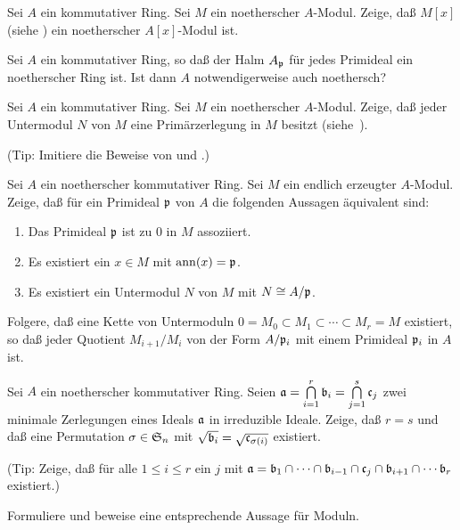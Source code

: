 \begin{exercise}
	Sei \(A\) ein kommutativer Ring.
	Sei \(M\) ein noetherscher \(A\)-Modul. Zeige, daß \(M[x]\) (siehe
	) ein noetherscher \(A[x]\)-Modul ist.
\end{exercise}

\begin{exercise}
	Sei \(A\) ein kommutativer Ring, so daß der Halm \(A_{\mathfrak{p}}\)
	für jedes Primideal ein noetherscher Ring ist. Ist dann \(A\)
	notwendigerweise auch noethersch?
\end{exercise}

\begin{exercise}
	Sei \(A\) ein kommutativer Ring. Sei \(M\) ein noetherscher \(A\)-Modul.
	Zeige, daß jeder Untermodul \(N\) von \(M\) eine Primärzerlegung in
	\(M\) besitzt (siehe~).
	
	(Tip: Imitiere die Beweise von  und
	.)
\end{exercise}

\begin{exercise}
	\label{exer:primes_to_mod}
	Sei \(A\) ein noetherscher kommutativer Ring. Sei \(M\) ein endlich
	erzeugter \(A\)-Modul. Zeige, daß für ein Primideal \(\mathfrak{p}\) von \(A\)
	die folgenden Aussagen äquivalent sind:
	\begin{enumerate}
	\item
		Das Primideal \(\mathfrak{p}\) ist zu \(0\) in \(M\) assoziiert.
	\item
		Es existiert ein \(x \in M\) mit \(\operatorname{ann}(x) = \mathfrak{p}\).
	\item
		Es existiert ein Untermodul \(N\) von \(M\) mit \(N \cong A/\mathfrak{p}\).
	\end{enumerate}
	
	Folgere, daß eine Kette von Untermoduln \(0 = M_0 \subset M_1 \subset \dotsb \subset
	M_r = M\) existiert, so daß jeder Quotient \(M_{i + 1}/M_i\) von der
	Form \(A/\mathfrak{p}_i\) mit einem Primideal \(\mathfrak{p}_i\) in \(A\) ist.
\end{exercise}

\begin{exercise}
	Sei \(A\) ein noetherscher kommutativer Ring. Seien
	\(\mathfrak{a} = \bigcap\limits_{i = 1}^r \mathfrak{b}_i
	= \bigcap\limits_{j = 1}^s \mathfrak{c}_j\) zwei minimale Zerlegungen
	eines Ideals \(\mathfrak{a}\) in irreduzible Ideale. Zeige, daß
	\(r = s\) und daß eine Permutation \(\sigma \in \mathfrak S_n\) mit
	\(\sqrt{\mathfrak{b}_i} = \sqrt{\mathfrak{c}_{\sigma(i)}}\) existiert.
	
	(Tip: Zeige, daß für alle \(1 \leq i \leq r\) ein \(j\) mit
	\(\mathfrak{a} = \mathfrak{b}_1 \cap \dotsb \cap \mathfrak{b}_{i - 1} \cap
	\mathfrak{c}_j \cap \mathfrak{b}_{i + 1} \cap \dotsb \mathfrak{b}_r\) existiert.)
	
	Formuliere und beweise eine entsprechende Aussage für Moduln.
\end{exercise}

